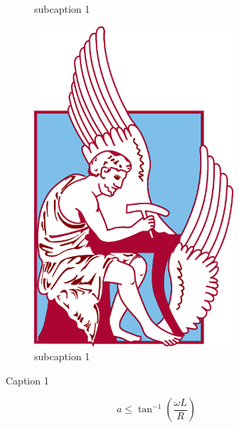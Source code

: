 \begin{figure}[h]
\begin{subfigure}{.5\textwidth}
		\caption{subcaption 1}
		\label{circ:1_phase_D}
	\end{subfigure}%
	\begin{subfigure}{.5\textwidth}
		\centering
		\includegraphics[width=\textwidth]{Images/university.png}
		\caption{subcaption 1}
		\label{circ:1_phase_Th}
	\end{subfigure}
	\caption{Caption 1}
\end{figure}

\begin{equation}
	a \leq \tan^{-1} \left(\frac{\omega L}{R} \right) \label{eq:Q11_V_o}
\end{equation}
